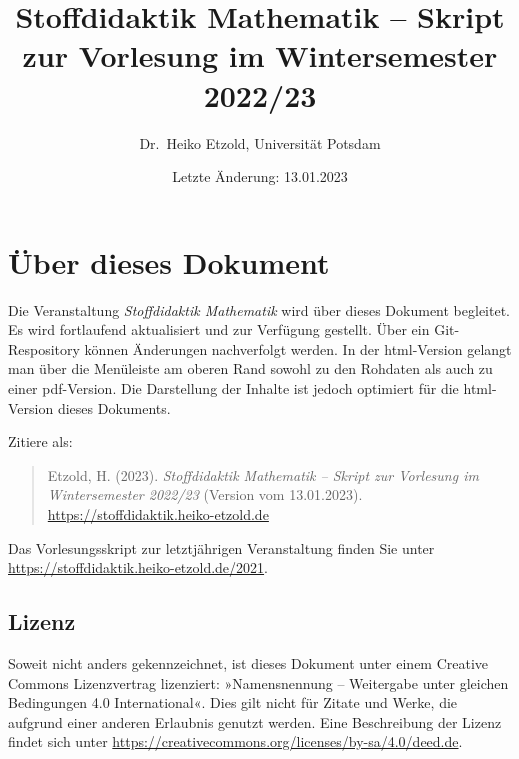 \documentclass[
]{scrbook}
\title{Stoffdidaktik Mathematik -- Skript zur Vorlesung im Wintersemester 2022/23}
\author{Dr.~Heiko Etzold, Universität Potsdam}
\date{Letzte Änderung: 13.01.2023}
\makeatletter
\def\renewtheorem#1{%
  \expandafter\let\csname#1\endcsname\relax
  \expandafter\let\csname c@#1\endcsname\relax
  \gdef\renewtheorem@envname{#1}
  \renewtheorem@secpar
}
\def\renewtheorem@secpar{\@ifnextchar[{\renewtheorem@numberedlike}{\renewtheorem@nonumberedlike}}
\def\renewtheorem@numberedlike[#1]#2{\newtheorem{\renewtheorem@envname}[#1]{#2}}
\def\renewtheorem@nonumberedlike#1{
\def\renewtheorem@caption{#1}
\edef\renewtheorem@nowithin{\noexpand\newtheorem{\renewtheorem@envname}{\renewtheorem@caption}}
\renewtheorem@thirdpar
}
\def\renewtheorem@thirdpar{\@ifnextchar[{\renewtheorem@within}{\renewtheorem@nowithin}}
\def\renewtheorem@within[#1]{\renewtheorem@nowithin[#1]}
\theoremstyle{definition}
\theoremstyle{definition}
\theoremstyle{definition}
\theoremstyle{definition}
\theoremstyle{remark}
\makeatother
\begin{document}
\maketitle

% 

{
\hypersetup{linkcolor=}
\setcounter{tocdepth}{1}
\tableofcontents
}
\hypertarget{uxfcber-dieses-dokument}{%
\chapter*{Über dieses Dokument}\label{uxfcber-dieses-dokument}}

Die Veranstaltung \emph{Stoffdidaktik Mathematik} wird über dieses Dokument begleitet. Es wird fortlaufend aktualisiert und zur Verfügung gestellt. Über ein Git-Respository können Änderungen nachverfolgt werden. In der html-Version gelangt man über die Menüleiste am oberen Rand sowohl zu den Rohdaten als auch zu einer pdf-Version. Die Darstellung der Inhalte ist jedoch optimiert für die html-Version dieses Dokuments.

Zitiere als:

\begin{quote}
Etzold, H. (2023). \emph{Stoffdidaktik Mathematik -- Skript zur Vorlesung im Wintersemester 2022/23} (Version vom 13.01.2023). \url{https://stoffdidaktik.heiko-etzold.de}
\end{quote}

Das Vorlesungsskript zur letztjährigen Veranstaltung finden Sie unter \url{https://stoffdidaktik.heiko-etzold.de/2021}.

\hypertarget{lizenz}{%
\section*{Lizenz}\label{lizenz}}

Soweit nicht anders gekennzeichnet, ist dieses Dokument unter einem Creative Commons Lizenzvertrag lizenziert: »Namensnennung -- Weitergabe unter gleichen Bedingungen 4.0 International«. Dies gilt nicht für Zitate und Werke, die aufgrund einer anderen Erlaubnis genutzt werden.
Eine Beschreibung der Lizenz findet sich unter \url{https://creativecommons.org/licenses/by-sa/4.0/deed.de}.
\end{document}
